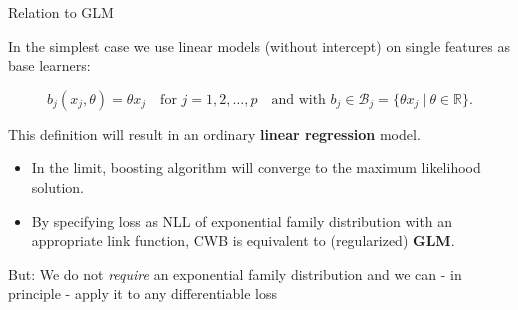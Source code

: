 \documentclass[11pt,compress,t,notes=noshow, xcolor=table]{beamer}
\begin{document}

\begin{vbframe}{Relation to GLM}

In the simplest case we use linear models (without intercept) on single features
as base learners:

$$
  b_j(x_j,\theta) = \theta x_j  \quad \text{for } j = 1, 2, \dots, p \quad
  \text{and with } b_j \in \mathcal{B}_j = \{\theta x_j  ~\rvert~ \theta \in
  \mathbb{R} \}.
$$


This definition will result in an ordinary \textbf{linear regression} model.

\lz


\begin{itemize} 
\setlength{\itemsep}{1.6em}
  \item In the limit, boosting algorithm will converge to the maximum likelihood solution.
  \item By specifying loss as NLL of exponential family distribution with an appropriate link function, CWB is equivalent to (regularized) \textbf{GLM}.
\end{itemize}

\framebreak


But: We do not \emph{require} an exponential family distribution and we can - in principle - apply it to any differentiable loss %


\end{vbframe}
\end{document}
